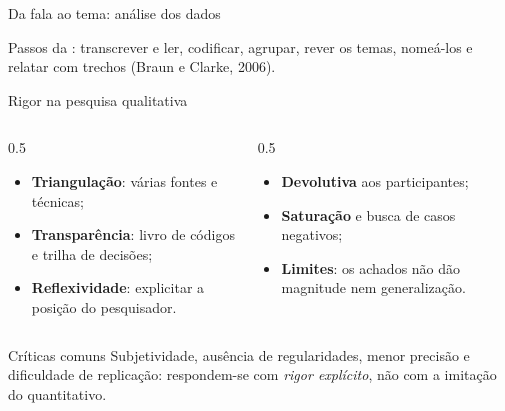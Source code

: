 \begin{frame}{Da fala ao tema: análise dos dados}
  \centering
  \vspace{0.2cm}\par
  \footnotesize Passos da : transcrever e ler, codificar, agrupar, rever os temas, nomeá-los e relatar com trechos (Braun e Clarke, 2006).
\end{frame}

\begin{frame}{Rigor na pesquisa qualitativa}
  \begin{columns}[T]
    \begin{column}{0.5\textwidth}
      \begin{itemize}
        \item \textbf{Triangulação}: várias fontes e técnicas;
        \item \textbf{Transparência}: livro de códigos e trilha de decisões;
        \item \textbf{Reflexividade}: explicitar a posição do pesquisador.
      \end{itemize}
    \end{column}
    \begin{column}{0.5\textwidth}
      \begin{itemize}
        \item \textbf{Devolutiva} aos participantes;
        \item \textbf{Saturação} e busca de casos negativos;
        \item \textbf{Limites}: os achados não dão magnitude nem generalização.
      \end{itemize}
    \end{column}
  \end{columns}
  \vspace{0.3cm}
  \begin{block}{Críticas comuns}
    \small Subjetividade, ausência de regularidades, menor precisão e dificuldade de replicação: respondem-se com \emph{rigor explícito}, não com a imitação do quantitativo.
  \end{block}
\end{frame}

